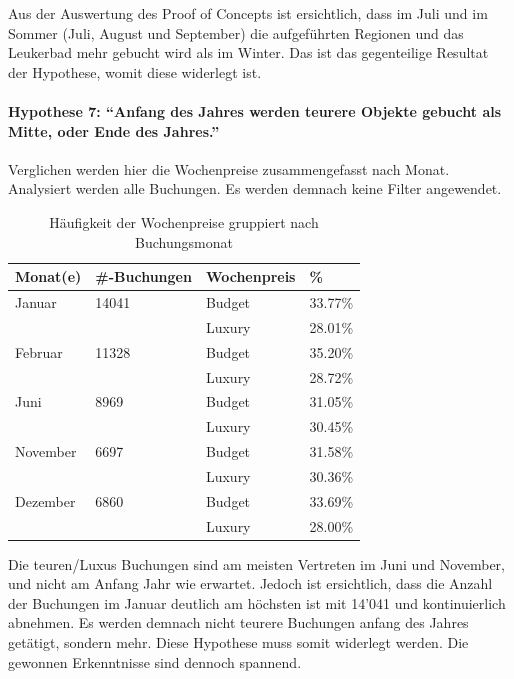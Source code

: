 Aus der Auswertung des Proof of Concepts ist ersichtlich, dass im Juli und im Sommer (Juli, August und September) die aufgeführten Regionen und das Leukerbad mehr gebucht wird als im Winter. Das ist das gegenteilige Resultat der Hypothese, womit diese widerlegt ist.

\paragraph{Hypothese 7: "`Anfang des Jahres werden teurere Objekte gebucht als Mitte, oder Ende des Jahres."'} Verglichen werden hier die Wochenpreise zusammengefasst nach Monat. Analysiert werden alle Buchungen. Es werden demnach keine Filter angewendet.
\begin{table}[H] 
	\caption{Häufigkeit der Wochenpreise gruppiert nach Buchungsmonat}
	\centering
	\label{fig:testingfazit:testing:hypothesen:7}
	\begin{tabular}{ | l | l | l | l | } 
		\hline 
		\rowcolor{tableheadcolor}
		\bfseries Monat(e) & \bfseries \#-Buchungen & \bfseries Wochenpreis & \bfseries \% \\ \hline 
		Januar & 14041 & Budget & 33.77\% \\ \cline{3-4} 
		 & & Luxury & 28.01\% \\ \hline
		 Februar & 11328 & Budget & 35.20\% \\ \cline{3-4} 
 		 & & Luxury & 28.72\% \\ \hline
		 Juni & 8969 & Budget & 31.05\% \\ \cline{3-4} 
 		 & & Luxury & 30.45\% \\ \hline
		 November & 6697 & Budget & 31.58\% \\ \cline{3-4}
 		 & & Luxury & 30.36\% \\ \hline
		 Dezember & 6860 & Budget & 33.69\% \\ \cline{3-4} 
 		 & & Luxury & 28.00\% \\ \hline		 
	\end{tabular}
\end{table}

Die teuren/Luxus Buchungen sind am meisten Vertreten im Juni und November, und nicht am Anfang Jahr wie erwartet. Jedoch ist ersichtlich, dass die Anzahl der Buchungen im Januar deutlich am höchsten ist mit 14'041 und kontinuierlich abnehmen. Es werden demnach nicht teurere Buchungen anfang des Jahres getätigt, sondern mehr. Diese Hypothese muss somit widerlegt werden. Die gewonnen Erkenntnisse sind dennoch spannend. 

